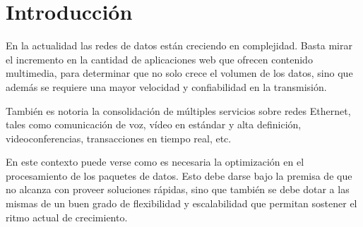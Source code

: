 \chapter{Introducción}

En la actualidad las redes de datos están creciendo en complejidad. Basta mirar el incremento en la cantidad de aplicaciones web que ofrecen contenido multimedia, para determinar que no solo crece el volumen de los datos, sino que además se requiere una mayor velocidad y confiabilidad en la transmisión. 

También es notoria la consolidación de múltiples servicios sobre redes Ethernet, tales como comunicación de voz, vídeo en estándar y alta definición, videoconferencias, transacciones en tiempo real, etc.

En este contexto puede verse como es necesaria la optimización en el procesamiento de los paquetes de datos. Esto debe darse bajo la premisa de que no alcanza con proveer soluciones rápidas, sino que también se debe dotar a las mismas de un buen grado de flexibilidad y escalabilidad que permitan sostener el ritmo actual de crecimiento.




